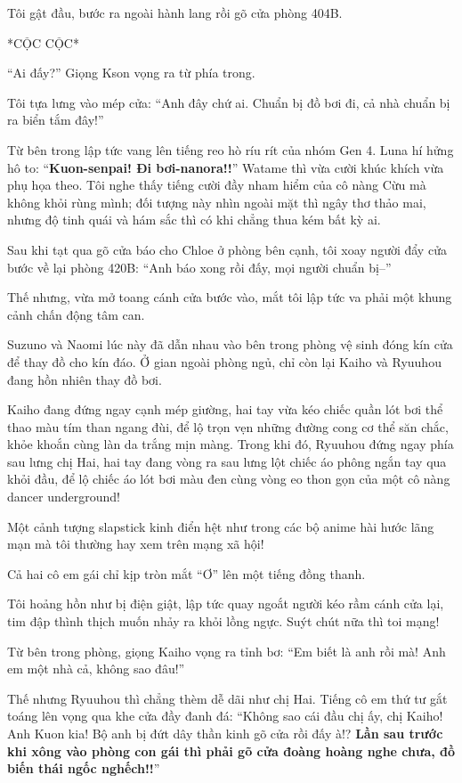 \documentclass[../main.tex]{subfiles}
\begin{document}
Tôi gật đầu, bước ra ngoài hành lang rồi gõ cửa phòng 404B.

*CỘC CỘC*

``Ai đấy?'' Giọng Kson vọng ra từ phía trong.

Tôi tựa lưng vào mép cửa: ``Anh đây chứ ai. Chuẩn bị đồ bơi đi, cả nhà chuẩn bị ra biển tắm đây!''

Từ bên trong lập tức vang lên tiếng reo hò ríu rít của nhóm Gen 4. Luna hí hửng hô to: ``\textbf{Kuon-senpai! Đi bơi-nanora!!}'' Watame thì vừa cười khúc khích vừa phụ họa theo. Tôi nghe thấy tiếng cười đầy nham hiểm của cô nàng Cừu mà không khỏi rùng mình; đối tượng này nhìn ngoài mặt thì ngây thơ thảo mai, nhưng độ tinh quái và hám sắc thì có khi chẳng thua kém bất kỳ ai.

Sau khi tạt qua gõ cửa báo cho Chloe ở phòng bên cạnh, tôi xoay người đẩy cửa bước về lại phòng 420B: ``Anh báo xong rồi đấy, mọi người chuẩn bị--''

Thế nhưng, vừa mở toang cánh cửa bước vào, mắt tôi lập tức va phải một khung cảnh chấn động tâm can.

Suzuno và Naomi lúc này đã dẫn nhau vào bên trong phòng vệ sinh đóng kín cửa để thay đồ cho kín đáo. Ở gian ngoài phòng ngủ, chỉ còn lại Kaiho và Ryuuhou đang hồn nhiên thay đồ bơi.

Kaiho đang đứng ngay cạnh mép giường, hai tay vừa kéo chiếc quần lót bơi thể thao màu tím than ngang đùi, để lộ trọn vẹn những đường cong cơ thể săn chắc, khỏe khoắn cùng làn da trắng mịn màng. Trong khi đó, Ryuuhou đứng ngay phía sau lưng chị Hai, hai tay đang vòng ra sau lưng lột chiếc áo phông ngắn tay qua khỏi đầu, để lộ chiếc áo lót bơi màu đen cùng vòng eo thon gọn của một cô nàng dancer underground!

Một cảnh tượng slapstick kinh điển hệt như trong các bộ anime hài hước lãng mạn mà tôi thường hay xem trên mạng xã hội!

Cả hai cô em gái chỉ kịp tròn mắt ``Ơ'' lên một tiếng đồng thanh.

Tôi hoảng hồn như bị điện giật, lập tức quay ngoắt người kéo rầm cánh cửa lại, tim đập thình thịch muốn nhảy ra khỏi lồng ngực. Suýt chút nữa thì toi mạng!

Từ bên trong phòng, giọng Kaiho vọng ra tỉnh bơ: ``Em biết là anh rồi mà! Anh em một nhà cả, không sao đâu!''

Thế nhưng Ryuuhou thì chẳng thèm dễ dãi như chị Hai. Tiếng cô em thứ tư gắt toáng lên vọng qua khe cửa đầy đanh đá: ``Không sao cái đầu chị ấy, chị Kaiho! Anh Kuon kia! Bộ anh bị đứt dây thần kinh gõ cửa rồi đấy à!? \textbf{Lần sau trước khi xông vào phòng con gái thì phải gõ cửa đoàng hoàng nghe chưa, đồ biến thái ngốc nghếch!!}''
\end{document}
